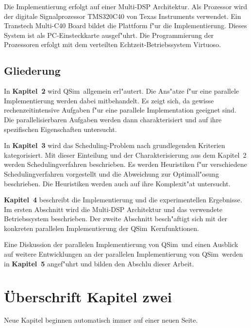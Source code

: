 \documentclass[11pt]{report}
\newcommand{\QSIM}{{\sc QSim}}
\begin{document}
Die Implementierung erfolgt auf einer Multi-DSP Architektur.  Als Prozessor 
wird der digitale Signalprozessor TMS320C40 von Texas Instruments verwendet. 
Ein Transtech Multi-C40 Board bildet die Plattform f"ur die Implementierung. 
Dieses System ist als PC-Einsteckkarte ausgef"uhrt.
Die Programmierung der Prozessoren erfolgt mit dem verteilten 
Echtzeit-Betriebssystem Virtuoso.


\section{Gliederung}

In {\bf Kapitel~2} wird \QSIM\ allgemein erl"autert. Die Ans"atze f"ur eine
parallele Implementierung werden dabei mitbehandelt.
Es zeigt sich, da\3 gewisse rechenzeitintensive Aufgaben f"ur eine parallele
Implementation geeignet sind.
Die paral\-lelisier\-baren Aufgaben werden dann charakterisiert und auf ihre 
spezifischen Eigenschaften untersucht.

In {\bf Kapitel~3} wird das Scheduling-Problem nach grundlegenden Kriterien 
kategorisiert. Mit dieser Einteilung und der Charakterisierung aus dem 
Kapitel~2 werden Schedulingverfahren beschrieben.
Es werden Heuristiken f"ur verschiedene Schedulingverfahren vorgestellt und 
die Abweichung zur Optimall"osung beschrieben. Die Heuristiken werden auch 
auf ihre Komplexit"at untersucht.

{\bf Kapitel~4} beschreibt die Implementierung und die experimentellen 
Ergebnisse.
Im ersten Abschnitt wird die Multi-DSP Architektur und das verwendete 
Betriebssystem beschrieben.
Der zweite Abschnitt be\-sch"aftigt sich mit der konkreten parallelen 
Implementierung der \QSIM\ Kernfunktionen.

Eine Diskussion der parallelen Implementierung von \QSIM\ und  einen Ausblick 
auf weitere Entwicklungen an der parallelen Implementierung von \QSIM\ werden 
in {\bf Kapitel~5} angef"uhrt und bilden den Abschlu\3 dieser Arbeit.

%

\chapter{\"{U}berschrift Kapitel zwei}
\label{kap:LabelKapitelZwei}
Neue Kapitel beginnen automatisch immer auf einer neuen Seite.
\end{document}
